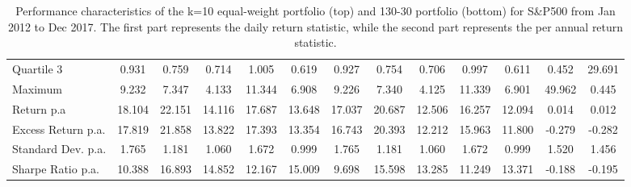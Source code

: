 \documentclass{article}
\begin{document}
\begin{table}[h]
\begin{tabular}{|p{2.4cm}|ccccc|ccccc|cc|}
Quartile 3  & 0.931 & 0.759 & 0.714 & 1.005 & 0.619 
& 0.927 & 0.754 & 0.706 & 0.997 & 0.611
& 0.452 & 29.691
\\
Maximum  & 9.232 & 7.347 & 4.133 & 11.344 & 6.908 
 & 9.226 & 7.340 & 4.125 & 11.339 & 6.901
 & 49.962 & 0.445
\\ \hline
Return p.a & 18.104 & 22.151 & 14.116 & 17.687 & 13.648 
 & 17.037 & 20.687 & 12.506 & 16.257 & 12.094 
 & 0.014 & 0.012
\\
Excess Return p.a. & 17.819 & 21.858 & 13.822 & 17.393 & 13.354
& 16.743 & 20.393 & 12.212 & 15.963 & 11.800
& -0.279 & -0.282
\\
Standard Dev. p.a.& 1.765 & 1.181 & 1.060 & 1.672 & 0.999
& 1.765 & 1.181 & 1.060 & 1.672 & 0.999
& 1.520 & 1.456
\\
Sharpe Ratio p.a. & 10.388 & 16.893 & 14.852 & 12.167 & 15.009 
 & 9.698 & 15.598 & 13.285 & 11.249 & 13.371
 & -0.188 & -0.195
\\
\hline
\end{tabular}
\caption{Performance characteristics of the k=10 equal-weight portfolio (top) and 130-30 portfolio (bottom) for S\&P500 from Jan 2012 to Dec 2017. The first part represents the daily return statistic, while the second part represents the per annual return statistic.}
\label{tab: sp500_daily_return}
\end{table}
\end{document}
